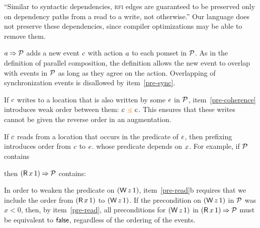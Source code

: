 ``Similar to syntactic dependencies, \textsc{rfi} edges are guaranteed to be preserved
only on dependency paths from a read to a write, not otherwise.''
Our language does not preserve these dependencies, since compiler
optimizations may be able to remove them.


$a\mathbin\Rightarrow\mathcal{P}$ adds a new event $c$ with action $a$ to each
pomset in $\mathcal{P}$.  As in the definition of parallel composition, the
definition allows the new event to overlap with events in $\mathcal{P}$ as long as
they agree on the action.  Overlapping of synchronization events is
disallowed by item~\ref{pre-sync}.

If $c$ writes to a location that is also written by some $e$ in $\mathcal{P}$,
item~\ref{pre-coherence} introduces weak order between them: $\cEv \gtN \aEv$.  This
ensures that these writes cannot be given the reverse order in an augmentation.

If $c$ reads from a location that occurs in the predicate of $e$, then
prefixing introduces order from $c$ to $e$.
whose predicate depends on $x$. 
For example, if $\mathcal{P}$ contains %
\begin{tikzinline}[node distance=1em]
\end{tikzinline}
then $(\DR{x}{1})\prefix\aPSS$ contains:
\begin{displaymathsmall}
\begin{tikzcenter}[node distance=1em]
\end{tikzcenter}
\qquad{}\qquad
\begin{tikzcenter}[node distance=1em]
\end{tikzcenter}
\end{displaymathsmall}
In order to weaken the predicate on $(\DW{z}{1})$, item~\ref{pre-read}b
requires that we include the order from $(\DR{x}{1})$ to $(\DW{z}{1})$.
If the precondition on $(\DW{z}{1})$ in $\mathcal{P}$ was $x<0$, then, by
item~\ref{pre-read}, all preconditions for $(\DW{z}{1})$ in
$(\DR{x}{1})\prefix\aPSS$ must be equivalent to $\mathsf{false}$, regardless of
the ordering of the events.

